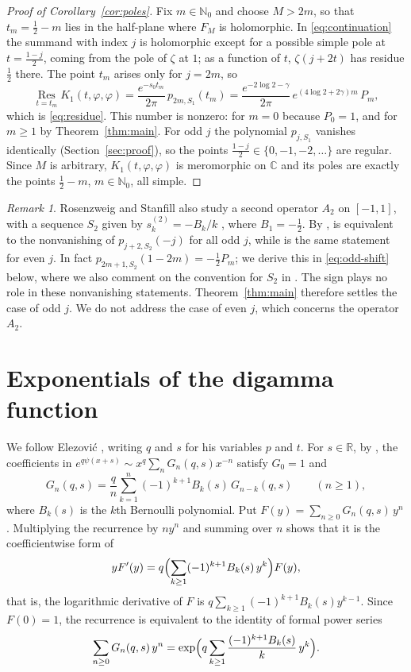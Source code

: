 \documentclass[11pt]{amsart}
\theoremstyle{definition}
\theoremstyle{remark}
\newtheorem{remark}[theorem]{Remark}
\numberwithin{equation}{section}
\newcommand{\N}{\mathbb{N}}
\newcommand{\C}{\mathbb{C}}
\newcommand{\Res}{\operatorname*{Res}}
\begin{document}
\begin{proof}[Proof of Corollary~\ref{cor:poles}]
Fix $m\in\N_0$ and choose $M>2m$, so that $t_m=\frac12-m$ lies in the half-plane where $F_M$ is holomorphic. In \eqref{eq:continuation} the summand with index $j$ is holomorphic except for a possible simple pole at $t=\frac{1-j}2$, coming from the pole of $\zeta$ at $1$; as a function of $t$, $\zeta(j+2t)$ has residue $\frac12$ there. The point $t_m$ arises only for $j=2m$, so
\[
  \Res_{t=t_m}K_1(t,\varphi,\varphi)=\frac{e^{-s_0t_m}}{2\pi}\,p_{2m,S_1}(t_m)=\frac{e^{-2\log2-\gamma}}{2\pi}\,e^{(4\log2+2\gamma)m}\,P_m,
\]
which is \eqref{eq:residue}. This number is nonzero: for $m=0$ because $P_0=1$, and for $m\ge1$ by Theorem~\ref{thm:main}. For odd $j$ the polynomial $p_{j,S_1}$ vanishes identically (Section~\ref{sec:proof}), so the points $\frac{1-j}2\in\{0,-1,-2,\dots\}$ are regular. Since $M$ is arbitrary, $K_1(t,\varphi,\varphi)$ is meromorphic on $\C$ and its poles are exactly the points $\frac12-m$, $m\in\N_0$, all simple.
\end{proof}

\begin{remark}\label{rem:combined}
Rosenzweig and Stanfill also study a second operator $A_2$ on $[-1,1]$, with a sequence $S_2$ given by $s^{(2)}_k=-B_k/k$ \cite[(2.8)]{RS}, where $B_1=-\frac12$. By \cite[Proposition~2.4, (2.17) and Remark~2.7]{RS}, \cite[Open Problem~1.3]{RS} is equivalent to the nonvanishing of $p_{j+2,S_2}(-j)$ for all odd $j$, while \cite[Open Problem~1.6(i)]{RS} is the same statement for even $j$. In fact \mbox{$p_{2m+1,S_2}(1-2m)=-\frac12P_m$}; we derive this in \eqref{eq:odd-shift} below, where we also comment on the convention for $S_2$ in \cite[(2.11) and (2.17)]{RS}. The sign plays no role in these nonvanishing statements. Theorem~\ref{thm:main} therefore settles the case of odd $j$. We do not address the case of even $j$, which concerns the operator $A_2$.
\end{remark}

\section{Exponentials of the digamma function}\label{sec:digamma}

We follow Elezovi\'c \cite{E}, writing $q$ and $s$ for his variables $p$ and $t$. For $s\in\mathbb{R}$, by \cite[Theorem~2.3]{E}, the coefficients in $e^{q\psi(x+s)}\sim x^q\sum_nG_n(q,s)x^{-n}$ satisfy $G_0=1$ and
\[
  G_n(q,s)=\frac qn\sum_{k=1}^n(-1)^{k+1}B_k(s)\,G_{n-k}(q,s)\qquad(n\ge1),
\]
where $B_k(s)$ is the $k$th Bernoulli polynomial. Put $F(y)=\sum_{n\ge0}G_n(q,s)\,y^n$. Multiplying the recurrence by $ny^n$ and summing over $n$ shows that it is the coefficientwise form of
\[
  yF'(y)=q\Bigl(\sum_{k\ge1}(-1)^{k+1}B_k(s)\,y^k\Bigr)F(y),
\]
that is, the logarithmic derivative of $F$ is $q\sum_{k\ge1}(-1)^{k+1}B_k(s)y^{k-1}$. Since $F(0)=1$, the recurrence is equivalent to the identity of formal power series
\begin{equation}\label{eq:Gfun}
  \sum_{n\ge0}G_n(q,s)\,y^n=\exp\Bigl(q\sum_{k\ge1}\frac{(-1)^{k+1}B_k(s)}{k}\,y^k\Bigr).
\end{equation}
\end{document}
